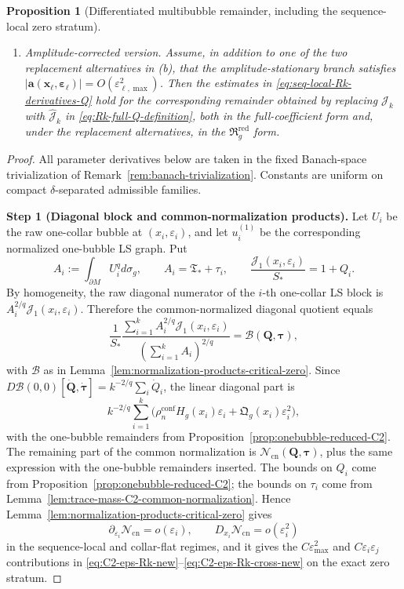 \documentclass[11pt,reqno,a4paper]{amsart}
\numberwithin{equation}{section}
\theoremstyle{plain}
\newtheorem{proposition}[theorem]{Proposition}
\theoremstyle{remark}
\theoremstyle{plain}
\begin{document}
\begin{proposition}[Differentiated multibubble remainder, including the sequence-local zero stratum]
\begin{enumerate}[label=\textup{(\alph*)},leftmargin=1.5em]
\item \emph{Amplitude-corrected version.}
Assume, in addition to one of the two replacement alternatives in \textup{(b)}, that the amplitude-stationary
branch satisfies
$|\mathbf a(\mathbf x_\ell,\boldsymbol\varepsilon_\ell)|=O(\varepsilon_{\ell,\max}^2)$.
Then the estimates in \eqref{eq:seq-local-Rk-derivatives-Q} hold for the corresponding remainder obtained by
replacing $\mathcal J_k$ with $\hat{\mathcal J}_k$ in \eqref{eq:Rk-full-Q-definition}, both in the full-coefficient
form and, under the replacement alternatives, in the $\mathfrak R_g^{\mathrm{red}}$ form.
\end{enumerate}
\end{proposition}

\begin{proof}
All parameter derivatives below are taken in the fixed Banach-space trivialization of
Remark~\ref{rem:banach-trivialization}.  Constants are uniform on compact
$\delta$-separated admissible families.

\smallskip\noindent
\textbf{Step 1 (Diagonal block and common-normalization products).}
Let $U_i$ be the raw one-collar bubble at $(x_i,\varepsilon_i)$, and let $u_i^{(1)}$ be the corresponding
normalized one-bubble LS graph.  Put
\[
A_i:=\int_{\partial M}U_i^qd\sigma_g,
\qquad
A_i=\mathfrak T_\ast+\tau_i,
\qquad
\frac{\mathcal J_1(x_i,\varepsilon_i)}{S_\ast}=1+Q_i.
\]
By homogeneity, the raw diagonal numerator of the $i$-th one-collar LS block is
$A_i^{2/q}\mathcal J_1(x_i,\varepsilon_i)$.  Therefore the common-normalized diagonal quotient equals
\begin{equation}\label{eq:diagonal-block-common-normalized}
\frac{1}{S_\ast}
\frac{\sum_{i=1}^kA_i^{2/q}\mathcal J_1(x_i,\varepsilon_i)}{(\sum_{i=1}^kA_i)^{2/q}}
=
\mathscr B(\mathbf Q,\boldsymbol\tau),
\end{equation}
with $\mathscr B$ as in Lemma~\ref{lem:normalization-products-critical-zero}.  Since
$D\mathscr B(0,0)[\dot{\mathbf Q},\dot{\boldsymbol\tau}]=k^{-2/q}\sum_i\dot Q_i$, the linear diagonal part is
\[
k^{-2/q}\sum_{i=1}^k
\Big(\rho_n^{\mathrm{conf}}H_g(x_i)\varepsilon_i+
\mathfrak Q_g(x_i)\varepsilon_i^2\Big),
\]
with the one-bubble remainders from Proposition~\ref{prop:onebubble-reduced-C2}.  The remaining part of the
common normalization is $\mathcal N_{\mathrm{cn}}(\mathbf Q,\boldsymbol\tau)$, plus the same expression with the
one-bubble remainders inserted.  The bounds on $Q_i$ come from Proposition~\ref{prop:onebubble-reduced-C2}; the
bounds on $\tau_i$ come from Lemma~\ref{lem:trace-mass-C2-common-normalization}.  Hence
Lemma~\ref{lem:normalization-products-critical-zero} gives
\[
\partial_{\varepsilon_i}\mathcal N_{\mathrm{cn}}=o(\varepsilon_i),
\qquad
D_{x_i}\mathcal N_{\mathrm{cn}}=o(\varepsilon_i^2)
\]
in the sequence-local and collar-flat regimes, and it gives the $C\varepsilon_{\max}^2$ and
$C\varepsilon_i\varepsilon_j$ contributions in
\eqref{eq:C2-eps-Rk-new}--\eqref{eq:C2-eps-Rk-cross-new} on the exact zero stratum.


\end{proof}
\end{document}
